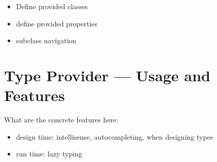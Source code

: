 \documentclass{llncs} %
\newcommand{\fs}{\textsf{F\#}\xspace}
\begin{document}
\begin{itemize}
	\item Define provided classes
	\item define provided properties
	\item subclass navigation
	
\end{itemize}
\section{Type Provider --- Usage and Features}
\label{sec:usage}

 What are the concrete features here:

\begin{itemize}
	\item design time: intellisense, autocompleting, when designing types
  \item run time: lazy typing
\end{itemize}

 
 

%
%
%
%
%
%
%
%
%
\end{document}
